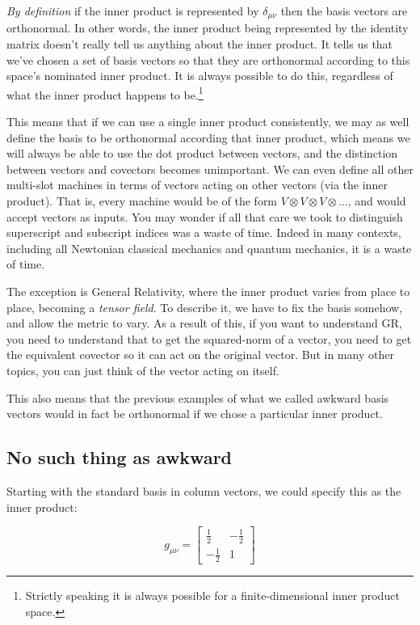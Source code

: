 \textit{By definition} if the inner product is represented by $\delta_{\mu\nu}$ then the basis vectors are orthonormal. In other words, the inner product being represented by the identity matrix doesn't really tell us anything about the inner product. It tells us that we've chosen a set of basis vectors so that they are orthonormal according to this space's nominated inner product. It is always possible to do this, regardless of what the inner product happens to be.\footnote{Strictly speaking it is always possible for a finite-dimensional inner product space.}

This means that if we can use a single inner product consistently, we may as well define the basis to be orthonormal according that inner product, which means we will always be able to use the dot product between vectors, and the distinction between vectors and covectors becomes unimportant. We can even define all other multi-slot machines in terms of vectors acting on other vectors (via the inner product). That is, every machine would be of the form $V \otimes V \otimes V \otimes \ldots$, and would accept vectors as inputs. You may wonder if all that care we took to distinguish superscript and subscript indices was a waste of time. Indeed in many contexts, including all Newtonian classical mechanics and quantum mechanics, it is a waste of time.

The exception is General Relativity, where the inner product varies from place to place, becoming a \textit{tensor field}. To describe it, we have to fix the basis somehow, and allow the metric to vary. As a result of this, if you want to understand GR, you need to understand that to get the squared-norm of a vector, you need to get the equivalent covector so it can act on the original vector. But in many other topics, you can just think of the vector acting on itself.

This also means that the previous examples of what we called awkward basis vectors would in fact be orthonormal if we chose a particular inner product.

\subsection{No such thing as awkward}

Starting with the standard basis in column vectors, we could specify this as the inner product:

$$
g_{\mu\nu} = 
\begin{bmatrix}
\frac{1}{2} & -\frac{1}{2} \\
-\frac{1}{2} & 1
\end{bmatrix}
$$

